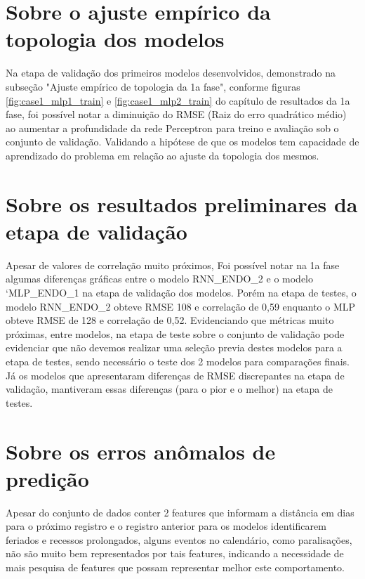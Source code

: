 \documentclass[	12pt, Times, openright, twoside, a4paper, english, brazil]{abntex2}
\begin{document}
    \section{Sobre o ajuste empírico da topologia dos modelos}
        Na etapa de validação dos primeiros modelos desenvolvidos, demonstrado na subseção "Ajuste empírico de topologia da 1a fase", conforme figuras \ref{fig:case1_mlp1_train} e \ref{fig:case1_mlp2_train} do capítulo de resultados da 1a fase, foi possível notar a diminuição do RMSE (Raiz do erro quadrático médio) ao aumentar a profundidade da rede Perceptron para treino e avaliação sob o conjunto de validação. Validando a hipótese de que os modelos tem capacidade de aprendizado do problema em relação ao ajuste da topologia dos mesmos.
        
    \section{Sobre os resultados preliminares da etapa de validação}
        Apesar de valores de correlação muito próximos, Foi possível notar na 1a fase algumas diferenças gráficas entre o modelo RNN\_ENDO\_2 e o modelo `MLP\_ENDO\_1 na etapa de validação dos modelos.  Porém na etapa de testes, o modelo  RNN\_ENDO\_2 obteve RMSE 108 e correlação de 0,59 enquanto o MLP obteve RMSE de 128 e correlação de 0,52. Evidenciando que métricas muito próximas, entre modelos, na etapa de teste sobre o conjunto de validação pode evidenciar que não devemos realizar uma seleção previa destes modelos para a etapa de testes, sendo necessário o teste dos 2 modelos para comparações finais. Já os modelos que apresentaram diferenças de RMSE discrepantes na etapa de validação, mantiveram essas diferenças (para o pior e o melhor) na etapa de testes.

    \section{Sobre os erros anômalos de predição}
        Apesar do conjunto de dados conter 2 features que informam a distância em dias para o próximo registro e o registro anterior para os modelos identificarem feriados e recessos prolongados, alguns eventos no calendário, como paralisações, não são muito bem representados por tais features, indicando a necessidade de mais pesquisa de features que possam representar melhor este comportamento.
\end{document}
